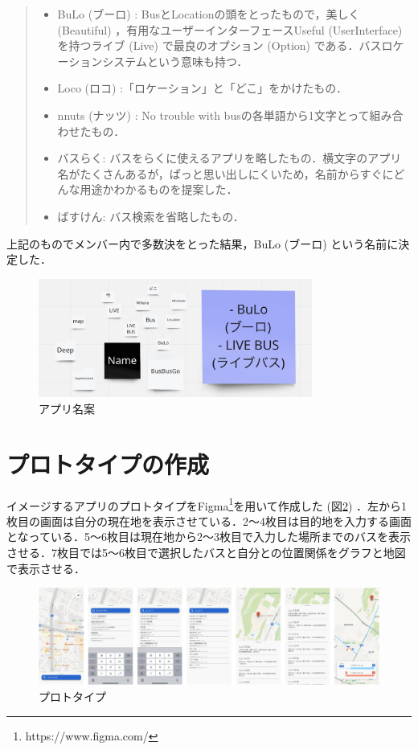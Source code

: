 \begin{quote}
    \begin{itemize}
        \item BuLo (ブーロ) : BusとLocationの頭をとったもので，美しく (Beautiful) ，有用なユーザーインターフェースUseful (UserInterface) を持つライブ (Live) で最良のオプション (Option) である．バスロケーションシステムという意味も持つ．
        \item Loco (ロコ) :「ロケーション」と「どこ」をかけたもの．
        \item nnuts (ナッツ) : No trouble with busの各単語から1文字とって組み合わせたもの．
        \item バスらく: バスをらくに使えるアプリを略したもの．横文字のアプリ名がたくさんあるが，ぱっと思い出しにくいため，名前からすぐにどんな用途かわかるものを提案した．
        \item ばすけん: バス検索を省略したもの．
    \end{itemize}
\end{quote}

上記のものでメンバー内で多数決をとった結果，BuLo (ブーロ) という名前に決定した．

\begin{figure}[htbp]
    \centering
    \includegraphics[width=9cm]{images/app_name.png}
    \caption{アプリ名案}
    \label{fig:app_name}
\end{figure}


\section{プロトタイプの作成}
イメージするアプリのプロトタイプをFigma\footnote{https://www.figma.com/}を用いて作成した (図\ref{fig:prototype_v2}) ．左から1枚目の画面は自分の現在地を表示させている．2〜4枚目は目的地を入力する画面となっている．5〜6枚目は現在地から2〜3枚目で入力した場所までのバスを表示させる．7枚目では5〜6枚目で選択したバスと自分との位置関係をグラフと地図で表示させる．

\begin{figure}[htbp]
    \centering
    \includegraphics[width=12cm]{images/prototype_v2.png}
    \caption{プロトタイプ}
    \label{fig:prototype_v2}
\end{figure}

